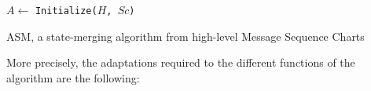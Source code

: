 \begin{algorithm}
{
\vspace{0.2cm}

$A \leftarrow $ {\tt Initialize($H$, $Sc$)}\\
}
\vspace{0.2cm}
\caption{\textsc{ASM}, a state-merging algorithm from high-level Message Sequence Charts\label{ASM}}
\end{algorithm}

More precisely, the adaptations required to the different functions of the algorithm are the following:
